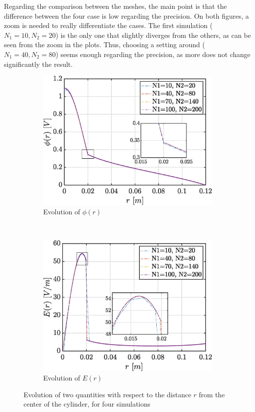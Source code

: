 \documentclass[a4paper,12pt,twoside]{article}
\newcommand{\bracket}[1]{\left(#1\right)}
\begin{document}
  Regarding the comparison between the meshes, the main point is that the difference between the four case is low regarding the precision.
  On both figures, a zoom is needed to really differentiate the cases.
  The first simulation ($N_1=10, N_2=20$) is the only one that slightly diverges from the others, as can be seen from the zoom in the plots.
  Thus, choosing a setting around ($N_1=40, N_2=80$) seems enough regarding the precision, as more does not change significantly the result.\\

  \begin{figure}[h]
    \centering
    \begin{subfigure}{0.45\textwidth}
      \includegraphics[width=\textwidth]{graphs/exd1-evoPhi}
      \caption{Evolution of $\phi\bracket{r}$}
      \label{fig:d1-evoPhi}
    \end{subfigure}
    ~
    \begin{subfigure}{0.45\textwidth}
      \includegraphics[width=\textwidth]{graphs/exd1-evoEr}
      \caption{Evolution of $E(r)$}
      \label{fig:d1-evoEr}
    \end{subfigure}
    \caption{Evolution of two quantities with respect to the distance $r$ from the center of the cylinder, for four simulations}
    \label{fig:d1-evo}
  \end{figure}
\end{document}
